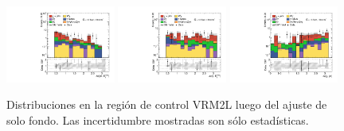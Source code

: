 \begin{figure}[ht!]
\begin{center}
    \includegraphics[width=0.32\textwidth]{images_tmp/results/fr2/can_VRM2L_dphi_jetmet_afterFit.pdf}
    \includegraphics[width=0.32\textwidth]{images_tmp/results/fr2/can_VRM2L_dphi_gammet_afterFit.pdf}
    \includegraphics[width=0.32\textwidth]{images_tmp/results/fr2/can_VRM2L_dphi_gamjet_afterFit.pdf}

    \caption{Distribuciones en la región de control VRM2L luego del ajuste de solo fondo. Las incertidumbre mostradas son sólo estadísticas.}
    \label{fig:dist_vrm2l_bkgonly}
  \end{center}
\end{figure}

